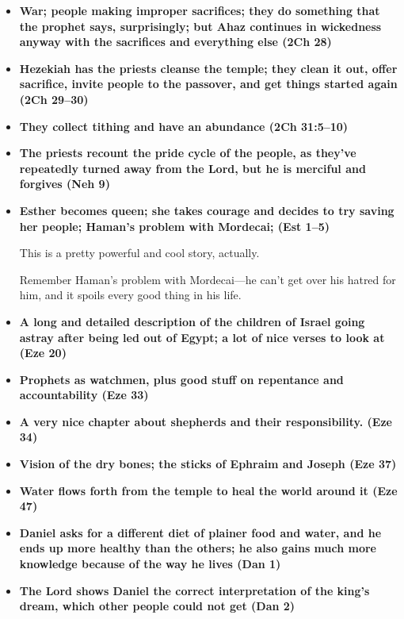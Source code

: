 \begin{itemize}
\item \textbf{War; people making improper sacrifices; they do something that the prophet says, surprisingly; but Ahaz continues in wickedness anyway with the sacrifices and everything else (2Ch 28)}

\item \textbf{Hezekiah has the priests cleanse the temple; they clean it out, offer sacrifice, invite people to the passover, and get things started again (2Ch 29--30)}

\item \textbf{They collect tithing and have an abundance (2Ch 31:5--10)}

\item \textbf{The priests recount the pride cycle of the people, as they've repeatedly turned away from the Lord, but he is merciful and forgives (Neh 9)}

\item \textbf{Esther becomes queen; she takes courage and decides to try saving her people; Haman's problem with Mordecai; (Est 1--5)}

	This is a pretty powerful and cool story, actually.
	
	Remember Haman's problem with Mordecai---he can't get over his hatred for him, and it spoils every good thing in his life.
	
\item \textbf{A long and detailed description of the children of Israel going astray after being led out of Egypt; a lot of nice verses to look at (Eze 20)}

\item \textbf{Prophets as watchmen, plus good stuff on repentance and accountability (Eze 33)}

\item \textbf{A very nice chapter about shepherds and their responsibility. (Eze 34)} 

\item \textbf{Vision of the dry bones; the sticks of Ephraim and Joseph (Eze 37)}

\item \textbf{Water flows forth from the temple to heal the world around it (Eze 47)}

\item \textbf{Daniel asks for a different diet of plainer food and water, and he ends up more healthy than the others; he also gains much more knowledge because of the way he lives (Dan 1)}

\item \textbf{The Lord shows Daniel the correct interpretation of the king's dream, which other people could not get (Dan 2)}


\end{itemize}
